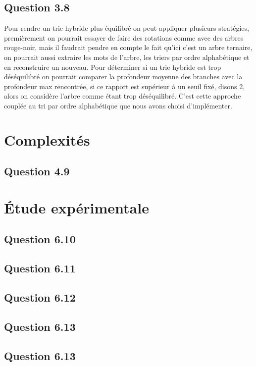 \documentclass[11pt]{rapport-algav}
\begin{document}
\section{Question 3.8}
Pour rendre un trie hybride plus équilibré on peut appliquer plusieurs stratégies, premièrement on pourrait essayer de faire des rotations comme avec des arbres rouge-noir, mais il faudrait pendre en compte le fait qu'ici c'est un arbre ternaire, on pourrait aussi extraire les mots de l'arbre, les triers par ordre alphabétique et en reconstruire un nouveau.
Pour déterminer si un trie hybride est trop déséquilibré on pourrait comparer la profondeur moyenne des branches avec la profondeur max rencontrée, si ce rapport est supérieur à un seuil fixé, disons 2, alors on considère l'arbre comme étant trop déséquilibré. C'est cette approche couplée au tri par ordre alphabétique que nous avons choisi d'implémenter.

\chapter{Complexités}
\section{Question 4.9}

\chapter{Étude expérimentale}
\section{Question 6.10}
\section{Question 6.11}
\section{Question 6.12}
\section{Question 6.13}
\section{Question 6.13}


\end{document}
